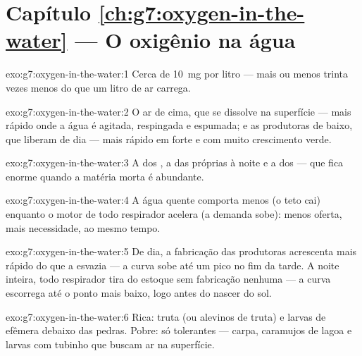 \section*{Capítulo \ref{ch:g7:oxygen-in-the-water} --- O oxigênio na água}

\begin{solution}{exo:g7:oxygen-in-the-water:1}
Cerca de \qty{10}{mg} por litro --- mais ou menos trinta vezes menos do
que um litro de ar carrega.
\end{solution}

\begin{solution}{exo:g7:oxygen-in-the-water:2}
O ar de cima, que se dissolve na superfície --- mais rápido onde a água
é agitada, respingada e espumada; e as produtoras de baixo, que
liberam  de dia --- mais rápido em  forte e com muito
crescimento verde.
\end{solution}

\begin{solution}{exo:g7:oxygen-in-the-water:3}
A  dos , a  das próprias  à noite e
a dos  --- que fica enorme quando a matéria morta é
abundante.
\end{solution}

\begin{solution}{exo:g7:oxygen-in-the-water:4}
A água quente comporta menos  (o teto cai) enquanto
o motor de todo respirador acelera (a demanda sobe): menos oferta,
mais necessidade, ao mesmo tempo.
\end{solution}

\begin{solution}{exo:g7:oxygen-in-the-water:5}
De dia, a fabricação das produtoras acrescenta  mais rápido do
que a  esvazia --- a curva sobe até um pico no fim da tarde.
A noite inteira, todo respirador tira do estoque sem fabricação
nenhuma --- a curva escorrega até o ponto mais baixo, logo antes do
nascer do sol.
\end{solution}

\begin{solution}{exo:g7:oxygen-in-the-water:6}
Rica: truta (ou alevinos de truta) e larvas de efêmera debaixo das
pedras. Pobre: só  tolerantes --- carpa, caramujos de lagoa e
larvas com tubinho que buscam ar na superfície.
\end{solution}


